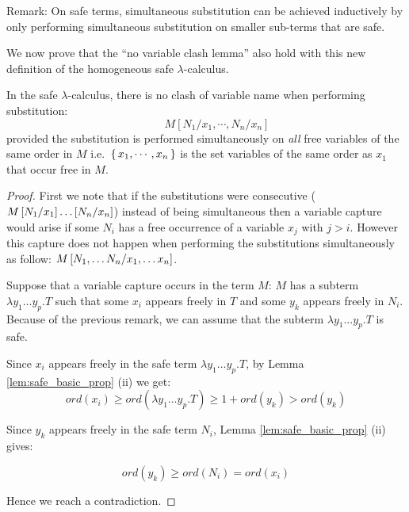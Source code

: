  Remark: On safe terms, simultaneous substitution can be achieved inductively by only performing
 simultaneous substitution on smaller sub-terms that are safe.

We now prove that the ``no variable clash lemma'' also hold with
this new definition of the homogeneous safe $\lambda$-calculus.

\begin{lem}
In the safe $\lambda$-calculus, there is no clash of variable name
when performing substitution:
\[ \qquad M[N_1 / x_1 , \cdots, N_n / x_n] \]
 provided the substitution is performed simultaneously on
\emph{all} free variables of the same order in $M$
i.e.~$\{\,{x_1, \cdots, x_n}\,\}$ is the set variables of the same
order as $x_1$ that occur free in $M$.
\end{lem}

\begin{proof}
First we note that if the substitutions were consecutive ($M
\left[ N_1/x_1 \right]\ldots \left[ N_n/x_n \right]$) instead of being
simultaneous then a variable capture would arise if some $N_i$ has a
free occurrence of a variable $x_j$ with $j>i$. However this capture
does not happen when performing the substitutions simultaneously as
follow: $M \left[ N_1, \ldots N_n/x_1, \ldots x_n \right]$.

Suppose that a variable capture occurs in the term $M$: $M$ has a
subterm $\lambda y_1 \ldots y_p. T$ such that some $x_i$ appears
freely in $T$ and some $y_k$ appears freely in $N_i$. Because of the
previous remark,
 we can assume that the subterm $\lambda y_1 \ldots y_p . T$ is safe.

Since $x_i$ appears freely in the safe term $\lambda y_1 \ldots y_p
. T$, by Lemma \ref{lem:safe_basic_prop} (ii) we get:
$$ ord(x_i) \geq ord(\lambda y_1 \ldots y_p . T) \geq 1+ ord(y_k) > ord(y_k)$$

Since $y_k$ appears freely in the safe term $N_i$, Lemma
\ref{lem:safe_basic_prop} (ii) gives:

$$ ord(y_k) \geq ord(N_i) = ord(x_i)$$

Hence we reach a contradiction.
\end{proof}
